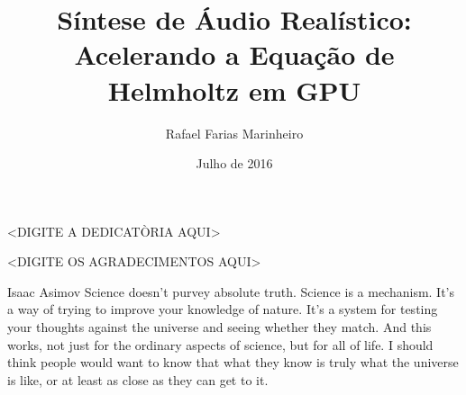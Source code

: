 \documentclass[oneside, bsc]{ufpethesis}
\institute{Centro de Informática}
\title{Síntese de Áudio Realístico: Acelerando a Equação de Helmholtz em GPU}
\date{Julho de 2016}
\author{Rafael Farias Marinheiro}
\begin{document}
\frontmatter

\frontpage

\presentationpage

\begin{dedicatory}
<DIGITE A DEDICATÒRIA AQUI>
\end{dedicatory}

\acknowledgements
<DIGITE OS AGRADECIMENTOS AQUI>

\begin{epigraph}[1988]{Isaac Asimov}
Science doesn't purvey absolute truth. Science is a mechanism. It's a way of trying to improve your knowledge of nature. It's a system for testing your thoughts against the universe and seeing whether they match. And this works, not just for the ordinary aspects of science, but for all of life. I should think people would want to know that what they know is truly what the universe is like, or at least as close as they can get to it.
\end{epigraph}



\tableofcontents

\listoffigures

\listoftables



\mainmatter







% 
% 
% 
\end{document}

